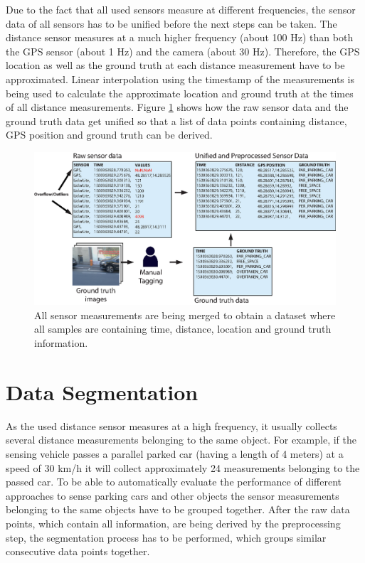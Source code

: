 Due to the fact that all used sensors measure at different frequencies, the sensor data of all sensors has to be unified before the next steps can be taken. The distance sensor measures at a much higher frequency (about 100 Hz) than both the GPS sensor (about 1 Hz) and the camera (about 30 Hz). Therefore, the GPS location as well as the ground truth at each distance measurement have to be approximated. Linear interpolation using the timestamp of the measurements is being used to calculate the approximate location and ground truth at the times of all distance measurements. Figure \ref{fig:preprocessing_dataset} shows how the raw sensor data and the ground truth data get unified so that a list of data points containing distance, GPS position and ground truth can be derived.

\begin{figure}
	\centering
	\includegraphics[width=\textwidth]{img/dataset-preprocessing.eps}
	\caption{ All sensor measurements are being merged to obtain a dataset where all samples are containing time, distance, location and ground truth information.}
	\label{fig:preprocessing_dataset}
\end{figure}





\section{Data Segmentation}
\label{sec:data_segmentation}

As the used distance sensor measures at a high frequency, it usually collects several distance measurements belonging to the same object. For example, if the sensing vehicle passes a parallel parked car (having a length of 4 meters) at a speed of 30 km/h it will collect approximately 24 measurements belonging to the passed car. To be able to automatically evaluate the performance of different approaches to sense parking cars and other objects the sensor measurements belonging to the same objects have to be grouped together. After the raw data points, which contain all information, are being derived by the preprocessing step, the segmentation process has to be performed, which groups similar consecutive data points together.

